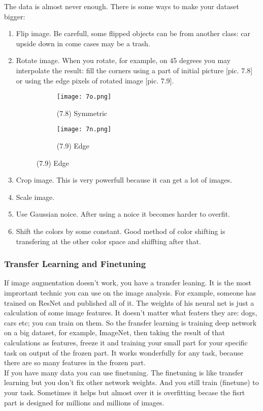 The data is almost never enough. There is some ways to make your dataset bigger:\\
\begin{enumerate}[label=$\bullet$]
  \item Flip image. Be carefull, some flipped objects can be from another class: car upside down in come cases may be a trash.
  \item Rotate image. When you rotate, for example, on 45 degrees you may interpolate the result: fill the corners using a part of initial picture [pic. 7.8] or using the edge pixels of rotated image [pic. 7.9].\\
  \begin{figure}[h]
  \centering
  \begin{subfigure}[l]{0.2\linewidth}
    \texttt{[image: 7o.png]}
    \caption*{(7.8) Symmetric}
  \end{subfigure}
  \hspace{2cm}
  \begin{subfigure}[r]{0.2\linewidth}
    \texttt{[image: 7n.png]}
    \caption*{(7.9) Edge}
  \end{subfigure}
\end{figure}
  \item Crop image. This is very powerfull because it can get a lot of images.
  \item Scale image.
  \item Use Gaussian noice. After using a noice it becomes harder to overfit.
  \item Shift the colors by some constant. Good method of color shifting is transfering at the other color space and shiffting after that.
\end{enumerate}

\subsubsection*{Transfer Learning and Finetuning}

If image augmentation doesn't work, you have a transfer leaning. It is the most imprortant technic you can use on the image analysis. For example, someone has trained on ResNet and published all of it. The weights of his neural net is just a calculation of some image features. It doesn't matter what featers they are: dogs, cars etc; you can train on them. So the fransfer learning is training deep network on a big dataset, for example, ImageNet, then taking the result of that calculations as features, freeze it and training your small part for your specific task on output of the frozen part. It works wonderfully for any task, because there are so many features in the frozen part.\\
If you have many data you can use finetuning. The finetuning is like transfer learning but you don't fix other network weights. And you still train (finetune) to your task. Sometimes it helps but almost over it is overfitting becase the fisrt part is designed for millions and millions of images.
